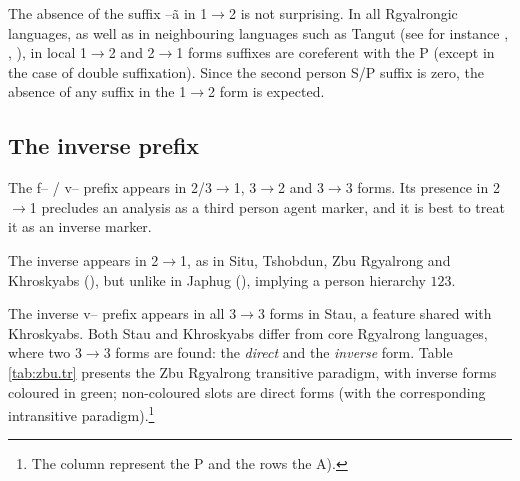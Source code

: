 \documentclass[oldfontcommands,oneside,a4paper,11pt]{article}
\newcommand{\ipa}[1]{{\phon #1}} %
\begin{document}
The absence of the suffix  \ipa{--ã}  in 1$\rightarrow$2 is not surprising. In all Rgyalrongic languages, as well as in neighbouring languages such as Tangut (see for instance \citealt[18]{jacques09tangutverb}, \citealt{gongxun12}, \citealt{lai14person}), in local 1$\rightarrow$2 and 2$\rightarrow$1 forms suffixes are coreferent with the P (except in the case of double suffixation). Since the second person S/P suffix is zero, the absence of any suffix in the 1$\rightarrow$2 form is expected.


\subsection{The inverse prefix}
The \ipa{f}-- / \ipa{v}-- prefix appears in 2/3$\rightarrow$1, 3$\rightarrow$2 and 3$\rightarrow$3 forms. Its presence  in 2$\rightarrow$1 precludes an analysis as a third person agent marker, and it is best to treat it as an inverse marker.

The inverse appears in 2$\rightarrow$1, as in Situ, Tshobdun, Zbu Rgyalrong and Khroskyabs (\citealt{delancey81direction, jackson02rentongdengdi, gongxun12, lai14person}), but unlike in  Japhug (\citealt{jacques10inverse}), implying a person hierarchy $1$\rightarrow$2$\rightarrow$3$. 



The inverse \ipa{v}-- prefix appears in all 3$\rightarrow$3 forms in Stau, a feature shared with Khroskyabs. Both Stau and Khroskyabs differ from core Rgyalrong languages, where two 3$\rightarrow$3 forms are found: the \textit{direct}   and the \textit{inverse} form. Table \ref{tab:zbu.tr} presents the Zbu Rgyalrong transitive paradigm, with inverse forms coloured in green; non-coloured slots are direct forms (with the corresponding intransitive paradigm).\footnote{The column represent the P and the rows the A).}
\end{document}
